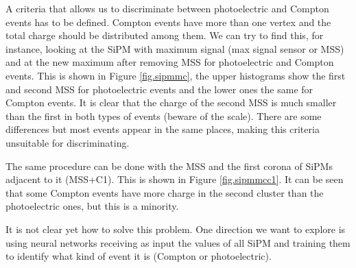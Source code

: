 A criteria that allows us to discriminate between photoelectric and Compton events has to be defined. Compton events have more than one vertex and the total charge should be distributed among them. We can try to find this, for instance, looking at the SiPM with maximum signal (max signal sensor or MSS) and at the new maximum after removing MSS for photoelectric and Compton events. This is shown in Figure \ref{fig.sipmmc}, the upper histograms show the first and second MSS for photoelectric events and the lower ones the same for Compton events. It is clear that the charge of the second MSS is much smaller than the first in both types of events (beware of the scale). There are some differences but most events appear in the same places, making this criteria unsuitable for discriminating.

The same procedure can be done with the MSS and the first corona of SiPMs adjacent to it (MSS+C1). This is shown in Figure \ref{fig.sipmmcc1}. It can be seen that some Compton events have more charge in the second cluster than the photoelectric ones, but this is a minority. 

It is not clear yet how to solve this problem. One direction we want to explore is using neural networks receiving as input the values of all SiPM and training them to identify what kind of event it is (Compton or photoelectric).

